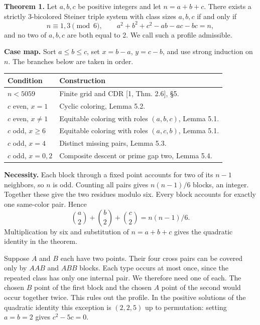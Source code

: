 \documentclass[english,11pt,a4paper]{article}
\begin{document}
\textbf{Theorem 1.} Let \(a,b,c\) be positive integers and let \(n=a+b+c\). There exists a strictly 3-bicolored Steiner triple system with class sizes \(a,b,c\) if and only if \[n\equiv1,3\pmod6,\qquad a^2+b^2+c^2-ab-ac-bc=n,\] and no two of \(a,b,c\) are both equal to 2. We call such a profile admissible.

\textbf{Case map.} Sort \(a\le b\le c\), set \(x=b-a\), \(y=c-b\), and use strong induction on \(n\). The branches below are taken in order.

{\begin{longtable}[]{@{}
  >{\raggedright\arraybackslash}p{}
  >{\raggedright\arraybackslash}p{}@{}}
\toprule\noalign{}
\begin{minipage}[b]{\linewidth}\raggedright
Condition
\end{minipage} & \begin{minipage}[b]{\linewidth}\raggedright
Construction
\end{minipage} \\
\midrule\noalign{}
\endhead
\bottomrule\noalign{}
\endlastfoot
\(n<5059\) & Finite grid and CDR {[}1, Thm. 2.6{]}, §5. \\
\(c\) even, \(x=1\) & Cyclic coloring, Lemma 5.2. \\
\(c\) even, \(x\ne1\) & Equitable coloring with roles \((a,b,c)\), Lemma 5.1. \\
\(c\) odd, \(x\ge6\) & Equitable coloring with roles \((a,c,b)\), Lemma 5.1. \\
\(c\) odd, \(x=4\) & Distinct missing pairs, Lemma 5.3. \\
\(c\) odd, \(x=0,2\) & Composite descent or prime gap two, Lemma 5.4. \\
\end{longtable}
}

\textbf{Necessity.} Each block through a fixed point accounts for two of its \(n-1\) neighbors, so \(n\) is odd. Counting all pairs gives \(n(n-1)/6\) blocks, an integer. Together these give the two residues modulo six. Every block accounts for exactly one same-color pair. Hence \[\binom a2+\binom b2+\binom c2=n(n-1)/6.\] Multiplication by six and substitution of \(n=a+b+c\) gives the quadratic identity in the theorem.

Suppose \(A\) and \(B\) each have two points. Their four cross pairs can be covered only by \(AAB\) and \(ABB\) blocks. Each type occurs at most once, since the repeated class has only one internal pair. We therefore need one of each. The chosen \(B\) point of the first block and the chosen \(A\) point of the second would occur together twice. This rules out the profile. In the positive solutions of the quadratic identity this exception is \((2,2,5)\) up to permutation: setting \(a=b=2\) gives \(c^2-5c=0\).
\end{document}
